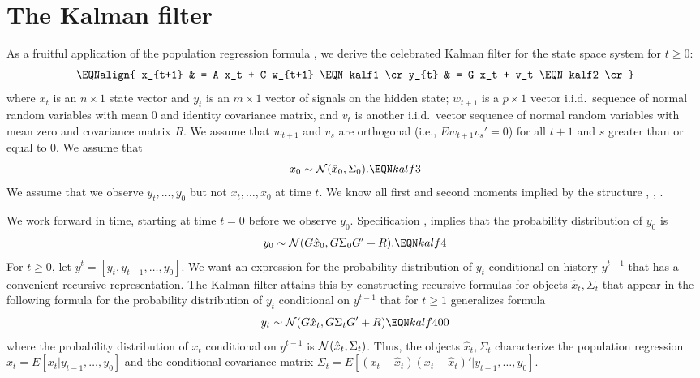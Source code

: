 \section{The Kalman filter}\label{sec:Kalman100}%
%
%
%
As a fruitful  application of the population regression formula
, we derive the celebrated Kalman filter for the
state space system for $t \geq 0$:
$$\EQNalign{ x_{t+1} & = A x_t + C w_{t+1} \EQN kalf1 \cr
             y_{t} & = G x_t + v_t \EQN kalf2 \cr} $$
where $x_t$ is an $n \times 1$ state vector and $y_t$ is an $m
\times 1$ vector of signals on the hidden state; $w_{t+1}$
is a $p \times 1$ vector i.i.d.~sequence of normal random variables
with mean $0$ and identity covariance matrix, and $v_t$ is another i.i.d.~vector sequence of normal random variables with mean zero and
covariance matrix $R$.  We assume that $w_{t+1}$ and $v_s$
are orthogonal (i.e., $E w_{t+1} v_s'=0$) for all $t+1$ and $s$ greater than or equal to $0$.
We assume that
$$x_0 \sim {\cal N}(\hat x_0, \Sigma_0) . \EQN kalf3 $$
We assume that we  observe $y_t, \ldots, y_0$ but not $x_t, \ldots , x_0$ at time
$t$. We know all  first and second moments implied by   the structure , , .



We work forward in time, starting at time $t=0$ before we observe $y_0$.
Specification ,  implies that the probability distribution of $y_0$ is
$$ y_0 \sim {\cal N}(G \hat x_0, G \Sigma_0 G' + R). \EQN kalf4 $$
For $t \geq 0$, let $y^t = [y_t, y_{t-1}, \ldots, y_0]$.  We want  an expression for the probability  distribution of $y_t$ conditional on
history
$y^{t-1}$ that has a convenient recursive representation. The Kalman filter attains this by constructing recursive formulas for objects $\hat x_t, \Sigma_t$
 that appear in the following formula for the probability distribution of $y_t$ conditional on $y^{t-1}$  that for $t \geq 1$ generalizes
 formula  
$$ y_t \sim {\cal N}(G \hat x_t, G \Sigma_t G' + R) \EQN kalf400 $$
where the probability distribution of $x_t$ conditional on $y^{t-1}$ is ${\cal N}(\hat x_t, \Sigma_t)$. Thus, 
the objects $\hat x_t, \Sigma_t$  characterize  the population regression $\hat x_t = E [ x_t | y_{t-1}, \ldots, y_0]$ and
the conditional covariance matrix
$\Sigma_t = E [(x_t -\hat x_t)(x_t -\hat x_t)' | y_{t-1}, \ldots, y_0]$.


